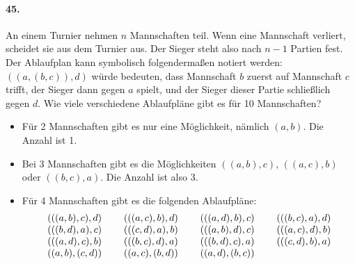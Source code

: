 \documentclass[10pt,a5paper,twoside]{article}
\newenvironment{problem}[1]{\paragraph*{#1}}{}
\begin{document}
\begin{problem}{45.}
	An einem Turnier nehmen $n$ Mannschaften teil. Wenn eine Mannschaft verliert, scheidet sie aus dem Turnier aus. Der Sieger steht also nach $n-1$ Partien fest. 
	Der Ablaufplan kann symbolisch folgendermaßen notiert werden: $((a,(b,c)),d)$ würde bedeuten, dass Mannschaft $b$ zuerst  auf Mannschaft $c$ trifft, der Sieger dann gegen $a$ spielt, und der Sieger dieser Partie schließlich gegen $d$. 
	Wie viele verschiedene Ablaufpläne gibt es für 10 Mannschaften?
	\begin{itemize}
	\item Für 2 Mannschaften gibt es nur eine Möglichkeit, nämlich $(a,b)$. Die Anzahl ist 1.
	\item Bei 3 Mannschaften gibt es die Möglichkeiten $((a,b),c)$, $((a,c),b)$ oder $((b,c),a)$. Die Anzahl ist also 3.
	\item Für 4 Mannschaften gibt es die folgenden Ablaufpläne:
	\begin{equation*}
	\begin{array}{@{}cccc@{}}
		(((a,b),c),d) & \quad\;(((a,c),b),d) & \quad\;(((a,d),b),c) & \quad\;(((b,c),a),d) \\
		(((b,d),a),c) & \quad\;(((c,d),a),b) & \quad\;(((a,b),d),c) & \quad\;(((a,c),d),b) \\ 
		(((a,d),c),b) & \quad\;(((b,c),d),a) & \quad\;(((b,d),c),a) & \quad\;(((c,d),b),a) \\
		((a,b),(c,d)) & \quad\;((a,c),(b,d)) & \quad\;((a,d),(b,c))
	\end{array}
	\end{equation*}
	\end{itemize}
\end{problem}
\end{document}
